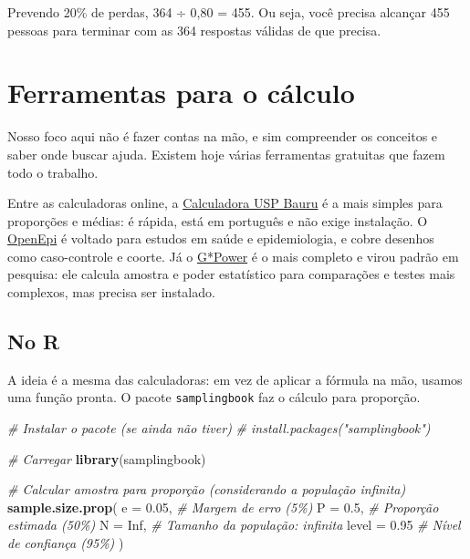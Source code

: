 \documentclass[
]{book}
\newenvironment{Shaded}{\begin{snugshade}}{\end{snugshade}}
\newcommand{\AttributeTok}[1]{\textcolor[rgb]{0.13,0.29,0.53}{#1}}
\newcommand{\CommentTok}[1]{\textcolor[rgb]{0.56,0.35,0.01}{\textit{#1}}}
\newcommand{\ConstantTok}[1]{\textcolor[rgb]{0.56,0.35,0.01}{#1}}
\newcommand{\FloatTok}[1]{\textcolor[rgb]{0.00,0.00,0.81}{#1}}
\newcommand{\FunctionTok}[1]{\textcolor[rgb]{0.13,0.29,0.53}{\textbf{#1}}}
\newcommand{\NormalTok}[1]{#1}
\begin{document}
Prevendo 20\% de perdas, 364 ÷ 0,80 = 455. Ou seja, você precisa alcançar 455 pessoas para terminar com as 364 respostas válidas de que precisa.

\section{Ferramentas para o cálculo}\label{ferramentas-para-o-cuxe1lculo}

Nosso foco aqui não é fazer contas na mão, e sim compreender os conceitos e saber onde buscar ajuda. Existem hoje várias ferramentas gratuitas que fazem todo o trabalho.

Entre as calculadoras online, a \href{http://estatistica.bauru.usp.br/calculoamostral/}{Calculadora USP Bauru} é a mais simples para proporções e médias: é rápida, está em português e não exige instalação. O \href{https://www.openepi.com/SampleSize/SSMean.htm}{OpenEpi} é voltado para estudos em saúde e epidemiologia, e cobre desenhos como caso-controle e coorte. Já o \href{https://www.gpower.hhu.de/en.html}{G*Power} é o mais completo e virou padrão em pesquisa: ele calcula amostra e poder estatístico para comparações e testes mais complexos, mas precisa ser instalado.

\subsection{No R}\label{no-r}

A ideia é a mesma das calculadoras: em vez de aplicar a fórmula na mão, usamos uma função pronta. O pacote \texttt{samplingbook} faz o cálculo para proporção.

\begin{Shaded}
\begin{Highlighting}[]
\CommentTok{\# Instalar o pacote (se ainda não tiver)}
\CommentTok{\# install.packages("samplingbook")}

\CommentTok{\# Carregar}
\FunctionTok{library}\NormalTok{(samplingbook)}

\CommentTok{\# Calcular amostra para proporção (considerando a população infinita)}
\FunctionTok{sample.size.prop}\NormalTok{(}
  \AttributeTok{e =} \FloatTok{0.05}\NormalTok{,          }\CommentTok{\# Margem de erro (5\%)}
  \AttributeTok{P =} \FloatTok{0.5}\NormalTok{,           }\CommentTok{\# Proporção estimada (50\%)}
  \AttributeTok{N =} \ConstantTok{Inf}\NormalTok{,           }\CommentTok{\# Tamanho da população: infinita}
  \AttributeTok{level =} \FloatTok{0.95}       \CommentTok{\# Nível de confiança (95\%)}
\NormalTok{  )}
\end{Highlighting}
\end{Shaded}
\end{document}
